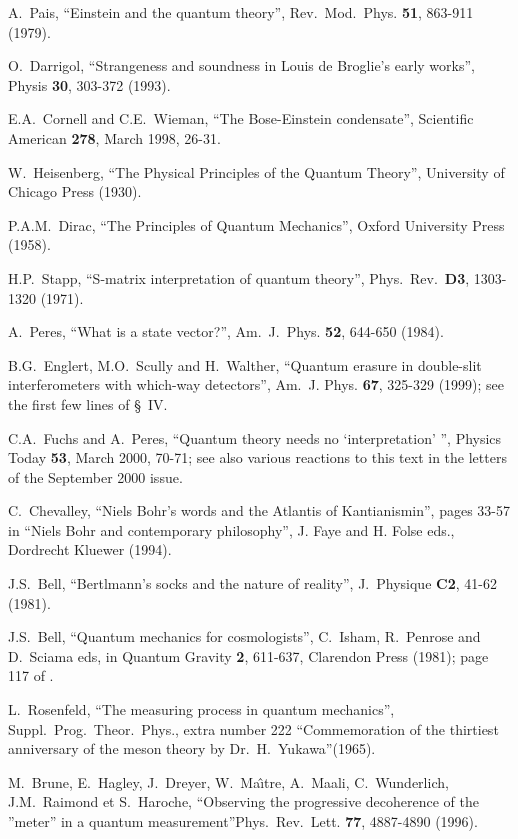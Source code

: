 \documentclass[12pt,onecolumn]{article}%
\begin{document}
\begin{thebibliography}{999}
A.\ Pais, ``Einstein and the quantum theory'',
Rev.\ Mod.\ Phys. \textbf{51}, 863-911 (1979).

O.\ Darrigol, ``Strangeness and soundness in Louis de
Broglie's early works'', Physis \textbf{30}, 303-372 (1993).

E.A.\ Cornell and C.E.\ Wieman, ``The Bose-Einstein
condensate'', Scientific American \textbf{278}, March 1998, 26-31.

W.\ Heisenberg, ``The Physical Principles of the Quantum
Theory'', University of Chicago Press (1930).

P.A.M.\ Dirac, ``The Principles of Quantum Mechanics'', Oxford
University Press (1958).

H.P.\ Stapp, ``S-matrix interpretation of quantum theory'',
Phys.\ Rev.\ \textbf{D3}, 1303-1320 (1971).

A.\ Peres, ``What is a state vector?'', Am.\ J.\ Phys.
\textbf{52}, 644-650 (1984).

B.G.\ Englert, M.O.\ Scully and H.\ Walther, ``Quantum
erasure in double-slit interferometers with which-way detectors'', Am.\ J.
Phys. \textbf{67}, 325-329 (1999); see the first few lines of \S \ IV.

C.A.\ Fuchs and A.\ Peres, ``Quantum theory needs no
`interpretation' '', Physics Today \textbf{53}, March 2000, 70-71; see also
various reactions to this text in the letters of the September 2000 issue.

C.\ Chevalley, ``Niels Bohr's words and the Atlantis of
Kantianismin'', pages 33-57 in ``Niels Bohr and contemporary philosophy'', J.
Faye and H. Folse eds., Dordrecht Kluewer (1994).

J.S.\ Bell, ``Bertlmann's socks and the nature of
reality'', J.\ Physique \textbf{C2}, 41-62 (1981).

J.S.\ Bell, ``Quantum mechanics for cosmologists'',
C.\ Isham, R.\ Penrose and D.\ Sciama eds, in Quantum Gravity \textbf{2},
611-637, Clarendon Press (1981); page 117 of \cite{Bell-livre}.

L.\ Rosenfeld, ``The measuring process in quantum
mechanics'', Suppl.\ Prog.\ Theor.\ Phys., extra number 222 ``Commemoration of
the thirtiest anniversary of the meson theory by Dr.\ H.\ Yukawa''(1965).

M.\ Brune, E.\ Hagley, J.\ Dreyer, W.\ Ma\^{\i}tre, A.\ Maali,
C.\ Wunderlich, J.M.\ Raimond et S.\ Haroche, ``Observing the progressive
decoherence of the ''meter'' in a quantum measurement''Phys.\ Rev.\ Lett.
\textbf{77}, 4887-4890 (1996).


\end{thebibliography}
\end{document}
